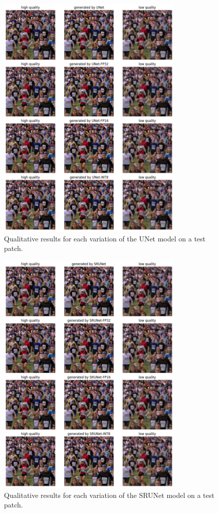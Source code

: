 \begin{figure}[ht]
\includegraphics[width=0.8\textwidth]{static/02_unet_qualitative_results.png}
\caption{Qualitative results for each variation of the UNet model on a test patch.}
\label{fig:crowd-qualitative-unet}
\end{figure}

\begin{figure}[ht]
\includegraphics[width=0.8\textwidth]{static/02_srunet_qualitative_results.png}
\caption{Qualitative results for each variation of the SRUNet model on a test patch.}
\label{fig:crowd-qualitative-srunet}
\end{figure}

